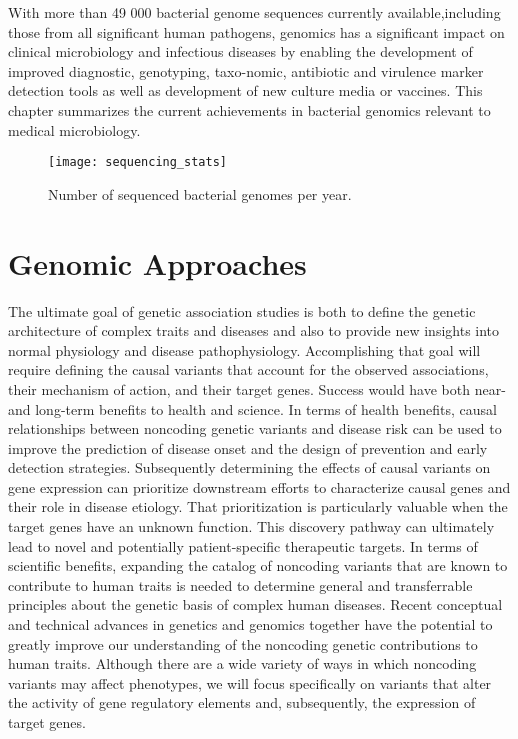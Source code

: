 With more than 49 000 bacterial genome sequences currently available,including those from all significant human pathogens, genomics has a significant impact on clinical microbiology and infectious diseases by enabling the development of improved diagnostic, genotyping, taxo-nomic, antibiotic and virulence marker detection tools as well as development of new culture media or vaccines. This chapter summarizes the current achievements in bacterial genomics relevant to medical microbiology.

\begin{figure}
	\centering
	\texttt{[image: sequencing\_stats]}
	\caption{ Number of sequenced bacterial genomes per year.}
	\label{fig:sequencing_stats}
\end{figure} 

\section{Genomic Approaches}
The ultimate goal of genetic association studies is both to define the genetic architecture of complex traits and diseases and also to provide new insights into normal physiology and disease pathophysiology. Accomplishing that goal will require defining the causal variants that account for the observed associations, their mechanism of action, and their target genes. Success would have both near- and long-term benefits to health and science. In terms of health benefits, causal relationships between noncoding genetic variants and disease risk can be used to improve the prediction of disease onset and the design of prevention and early detection strategies. Subsequently determining the effects of causal variants on gene expression can prioritize downstream efforts to characterize causal genes and their role in disease etiology. That prioritization is particularly valuable when the target genes have an unknown function. This discovery pathway can ultimately lead to novel and potentially patient-specific therapeutic targets. In terms of scientific benefits, expanding the catalog of noncoding variants that are known to contribute to human traits is needed to determine general and transferrable principles about the genetic basis of complex human diseases. Recent conceptual and technical advances in genetics and genomics together have the potential to greatly improve our understanding of the noncoding genetic contributions to human traits. Although there are a wide variety of ways in which noncoding variants may affect phenotypes, we will focus specifically on variants that alter the activity of gene regulatory elements and, subsequently, the expression of target genes\cite{lowe2015genomic}.  
